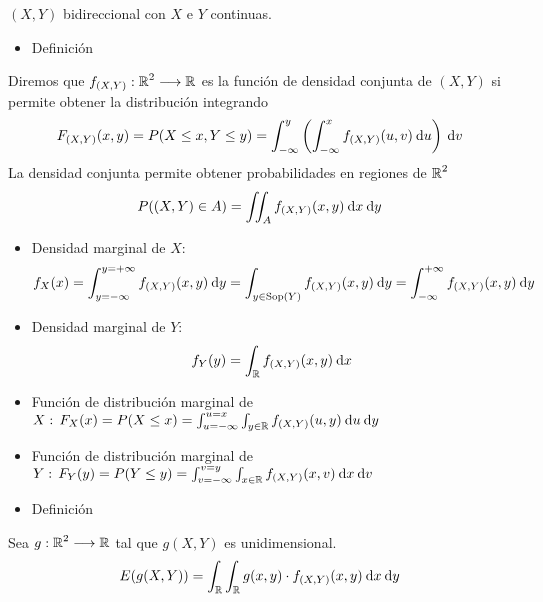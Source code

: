 \begin{enumerate}[label=\color{red}\textbf{\Alph*)}, leftmargin=*]
	$(X,Y)$ \va bidireccional con $X$ e $Y$ continuas.
	\begin{itemize}[label=\color{red}\textbullet, leftmargin=*]
		\item \color{lightblue}Definición
	\end{itemize}
	Diremos que $f_{(X,Y)}:\operatorname{\mathbb{R}}^2\longrightarrow\operatorname{\mathbb{R}}$ es la función de densidad conjunta de $(X,Y)$ si permite obtener la distribución integrando \[ F_{(X,Y)}(x,y)=P(X\le x,Y\le y)=\int_{-\infty}^{y}\left(\int_{-\infty}^{x}f_{(X,Y)}(u,v)\:\mathrm{d}u\right)\:\mathrm{d}v \]La densidad conjunta permite obtener probabilidades en regiones de $\operatorname{\mathbb{R}}^2$\[ P((X,Y)\in A)=\iint_Af_{(X,Y)}(x,y)\:\mathrm{d}x\:\mathrm{d}y \]
	\begin{itemize}[leftmargin=*]
		\item Densidad marginal de $X$:\[ f_X(x)=\int_{y=-\infty}^{y=+\infty}f_{(X,Y)}(x,y)\:\mathrm{d}y=\int_{y\in\operatorname{Sop}(Y)}f_{(X,Y)}(x,y)\:\mathrm{d}y=\int_{-\infty}^{+\infty}f_{(X,Y)}(x,y)\:\mathrm{d}y \]
		\item Densidad marginal de $Y$:\[ f_Y(y)=\int_{\operatorname{\mathbb{R}}} f_{(X,Y)}(x,y)\:\mathrm{d}x \]
		\item Función de distribución marginal de $X:\,F_X(x)=P(X\le x)=\int_{u=-\infty}^{u=x}\int_{y\in\operatorname{\mathbb{R}}}f_{(X,Y)}(u,y)\:\mathrm{d}u\:\mathrm{d}y$
		\item Función de distribución marginal de $Y:\,F_Y(y)=P(Y\le y)=\int_{v=-\infty}^{v=y}\int_{x\in\operatorname{\mathbb{R}}}f_{(X,Y)}(x,v)\:\mathrm{d}x\:\mathrm{d}v$
	\end{itemize}
	\begin{itemize}[label=\color{red}\textbullet, leftmargin=*]
		\item \color{lightblue}Definición
	\end{itemize}
	Sea $g:\operatorname{\mathbb{R}}^2\longrightarrow\operatorname{\mathbb{R}}$ tal que $g(X,Y)$ es \va unidimensional. \[ E(g(X,Y))=\int_{\operatorname{\mathbb{R}}}\int_{\operatorname{\mathbb{R}}} g(x,y)\cdot f_{(X,Y)}(x,y)\:\mathrm{d}x\:\mathrm{d}y \]
\end{enumerate}
